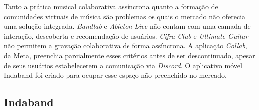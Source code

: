 Tanto a prática musical colaborativa assíncrona quanto a formação de comunidades
virtuais de música são problemas os quais o mercado não oferecia uma solução
integrada. \textit{Bandlab} e \textit{Ableton Live} não contam com uma camada de
interação, descoberta e recomendação de usuários. \textit{Cifra Club} e
\textit{Ultimate Guitar} não permitem a gravação colaborativa de forma
assíncrona. A aplicação \textit{Collab}, da Meta, preenchia parcialmente esses
critérios antes de ser descontinuado, apesar de seus usuários estabelecerem a comunicação via
\textit{Discord}. O aplicativo móvel Indaband foi criado para ocupar esse
espaço não preenchido no mercado.

\subsection{Indaband}

